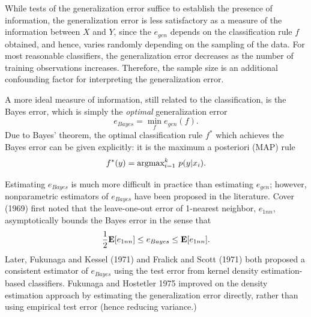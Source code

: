 \documentclass[12pt]{article}
\begin{document}
While tests of the generalization error suffice to establish the presence of information,
the generalization error is less satisfactory as a measure of the information between $X$ and $Y$,
since the $e_{gen}$ depends on the classification rule $f$ obtained, and hence, varies randomly depending on the sampling of the data.
For most reasonable classifiers, the generalization error decreases as the number of training observations increases.
Therefore, the sample size is an additional confounding factor for interpreting the generalization error.

A more ideal measure of information, still related to the classification, is the Bayes error, which is simply the \emph{optimal} generalization error
\[
e_{Bayes} = \min_f e_{gen}(f).
\]
Due to Bayes' theorem, the optimal classification rule $f^*$ which achieves the Bayes error can be given explicitly:
it is the maximum a posteriori (MAP) rule
\[
f^*(y) = \text{argmax}_{i=1}^k\ p(y|x_i).
\]

Estimating $e_{Bayes}$ is much more difficult in practice than estimating $e_{gen}$;
however, nonparametric estimators of $e_{Bayes}$ have been proposed in the literature.
Cover (1969) first noted that the leave-one-out error of 1-nearest neighbor, $e_{1nn}$,
asymptotically bounds the Bayes error in the sense that
\[
\frac{1}{2}\textbf{E}[e_{1nn}] \leq e_{Bayes} \leq \textbf{E}[e_{1nn}].
\]
Later, Fukunaga and Kessel (1971) and Fralick and Scott (1971) both proposed a consistent estimator of $e_{Bayes}$
using the test error from kernel density estimation-based classifiers.
Fukunaga and Hostetler 1975 improved on the density estimation approach by estimating the generalization error directly,
rather than using empirical test error (hence reducing variance.)
\end{document}
